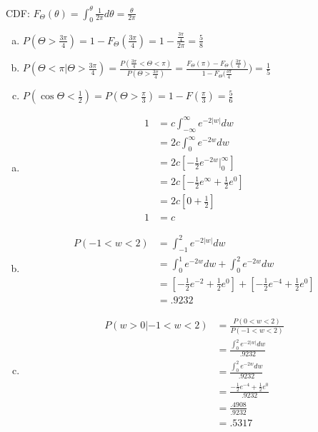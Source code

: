 \documentclass[12pt]{article}
\newenvironment{problem}[2][Problem]{\begin{trivlist}
\item[\hskip \labelsep {\bfseries #1}\hskip \labelsep {\bfseries #2.}]
  \vspace{1 cm}
}{\end{trivlist}}
\begin{document}
\begin{problem}{3.27}
\item
  CDF: $F_\Theta (\theta) = \int_0^{\theta} \frac{1}{2\pi} d\theta = \frac{\theta}{2\pi}$
  \begin{enumerate}[a.]
    \item %
      $P(\Theta > \frac{3\pi}{4}) = 1 - F_{\Theta}(\frac{3\pi}{4}) 
      = 1 - \frac{\frac{3\pi}{4}}{2\pi} = \frac{5}{8}$
    \item %
      $P(\Theta < \pi | \Theta > \frac{3\pi}{4}) 
      = \frac{P(\frac{3\pi}{4}<\Theta<\pi)}{P(\Theta > \frac{3\pi}{4})} 
      = \frac{F_\Theta(\pi) - F_\Theta(\frac{3\pi}{4})}{1-F_\Theta(\frac{3\pi}{4}})
      = \frac{1}{5}$
    \item %
      $P(\cos{\Theta} < \frac{1}{2}) = P(\Theta > \frac{\pi}{3})
      = 1-F(\frac{\pi}{3}) = \frac{5}{6}$
  \end{enumerate}
\end{problem}

\begin{problem}{3.29}
\item
  \begin{enumerate}[a.]
    \item %
      \begin{align*}
        1 &= c\int_{-\infty}^\infty e^{-2|w|}dw \\
        &= 2c\int_0^\infty e^{-2w}dw \\
        &= 2c\left[ -\frac{1}{2}e^{-2w}\big|_0^\infty \right] \\
        &= 2c\left[ -\frac{1}{2}e^{\infty} + \frac{1}{2}e^{0} \right] \\
        &= 2c\left[ 0 + \frac{1}{2} \right] \\
        1 &= c        
      \end{align*}
    \item %
      \begin{align*}
        P(-1<w<2) &= \int_{-1}^2 e^{-2|w|}dw \\
        &= \int_{0}^1 e^{-2w}dw + \int_{0}^2 e^{-2w}dw \\
        &= \left[ -\frac{1}{2}e^{-2} + \frac{1}{2}e^{0} \right] + 
          \left[ -\frac{1}{2}e^{-4} + \frac{1}{2}e^{0} \right] \\
        &= .9232 
      \end{align*}
    \item %
      \begin{align*}
        P(w>0|-1<w<2) &= \frac{P(0<w<2)}{P(-1<w<2)} \\ 
        &= \frac{\int_{0}^2 e^{-2|w|}dw}{.9232} \\
        &= \frac{\int_{0}^2 e^{-2w}dw}{.9232} \\
        &= \frac{-\frac{1}{2}e^{-4} + \frac{1}{2}e^{0}}{.9232} \\
        &= \frac{.4908}{.9232} \\
        &= .5317
      \end{align*}
  \end{enumerate}
\end{problem}
\end{document}
